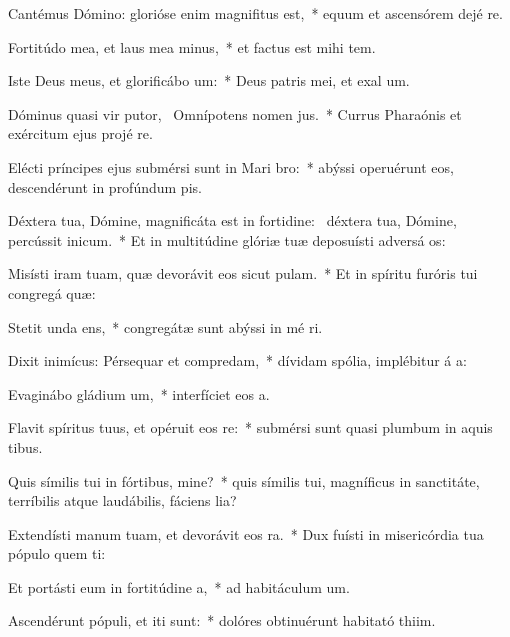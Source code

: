 \item Cantémus Dómino: glorióse enim magnifitus est,~* equum et ascensórem dejé  re.
\item Fortitúdo mea, et laus mea minus,~* et factus est mihi  tem.
\item Iste Deus meus, et glorificábo um:~* Deus patris mei, et exal um.
\item Dóminus quasi vir putor,~\pscross{} Omnípotens nomen jus.~* Currus Pharaónis et exércitum ejus projé  re.
\item Elécti príncipes ejus submérsi sunt in Mari bro:~* abýssi operuérunt eos, descendérunt in profúndum  pis.
\item Déxtera tua, Dómine, magnificáta est in fortidine:~\pscross{} déxtera tua, Dómine, percússit inicum.~* Et in multitúdine glóriæ tuæ deposuísti adversá os:
\item Misísti iram tuam, quæ devorávit eos sicut pulam.~* Et in spíritu furóris tui congregá  quæ:
\item Stetit unda ens,~* congregátæ sunt abýssi in mé ri.
\item Dixit inimícus: Pérsequar et compredam,~* dívidam spólia, implébitur á a:
\item Evaginábo gládium um,~* interfíciet eos  a.
\item Flavit spíritus tuus, et opéruit eos re:~* submérsi sunt quasi plumbum in aquis tibus.
\item Quis símilis tui in fórtibus, mine?~* quis símilis tui, magníficus in sanctitáte, terríbilis atque laudábilis, fáciens lia?
\item Extendísti manum tuam, et devorávit eos ra.~* Dux fuísti in misericórdia tua pópulo quem ti:
\item Et portásti eum in fortitúdine a,~* ad habitáculum  um.
\item Ascendérunt pópuli, et iti sunt:~* dolóres obtinuérunt habitató thiim.
